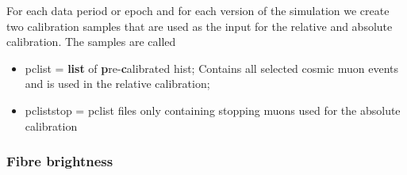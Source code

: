 
For each data period or epoch and for each version of the simulation we create two calibration samples that are used as the input for the relative and absolute calibration. The samples are called \cite{NOVA-doc-13579-CalibrationMetaREADFIRST}
\begin{itemize}
\item pclist = \textbf{list} of \textbf{p}re-\textbf{c}alibrated hist; Contains all selected cosmic muon events and is used in the relative calibration;
\item pcliststop = pclist files only containing stopping muons used for the absolute calibration 
\end{itemize}

\subsubsection*{Fibre brightness}

